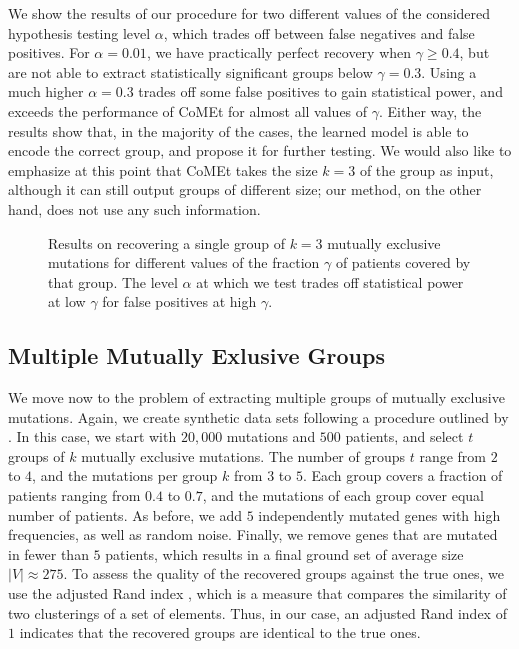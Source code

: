 We show the results of our procedure for two different values of the considered hypothesis testing level $\alpha$, which trades off between false negatives and false positives.
For $\alpha = 0.01$, we have practically perfect recovery when $\gamma \geq 0.4$, but are not able to extract statistically significant groups below $\gamma = 0.3$. 
Using a much higher $\alpha = 0.3$ trades off some false positives to gain statistical power, and exceeds the performance of CoMEt for almost all values of $\gamma$.
Either way, the results show that, in the majority of the cases, the learned \fldc{} model is able to encode the correct group, and propose it for further testing.
We would also like to emphasize at this point that CoMEt takes the size $k = 3$ of the group as input, although it can still output groups of different size; our method, on the other hand, does not use any such information.

\setlength{}
\setlength{}
\begin{figure}[htb]
  \centering
  
  \caption{Results on recovering a single group of $k = 3$ mutually exclusive mutations for different values of the fraction $\gamma$ of patients covered by that group.
  The level $\alpha$ at which we test trades off statistical power at low $\gamma$ for false positives at high $\gamma$.
  }
  \label{fig:syn_single}
\end{figure}

\subsection{Multiple Mutually Exlusive Groups}
We move now to the problem of extracting multiple groups of mutually exclusive mutations.
Again, we create synthetic data sets following a procedure outlined by \cite{comet}.
In this case, we start with $20,000$ mutations and $500$ patients, and select $t$ groups of $k$ mutually exclusive mutations.
The number of groups $t$ range from $2$ to $4$, and the mutations per group $k$ from $3$ to $5$.
Each group covers a fraction of patients ranging from $0.4$ to $0.7$, and the mutations of each group cover equal number of patients.
As before, we add $5$ independently mutated genes with high frequencies, as well as random noise.
Finally, we remove genes that are mutated in fewer than $5$ patients, which results in a final ground set of average size $|V| \approx 275$.
To assess the quality of the recovered groups against the true ones, we use the adjusted Rand index \citep{ari}, which is a measure that compares the similarity of two clusterings of a set of elements.
Thus, in our case, an adjusted Rand index of $1$ indicates that the recovered groups are identical to the true ones.

